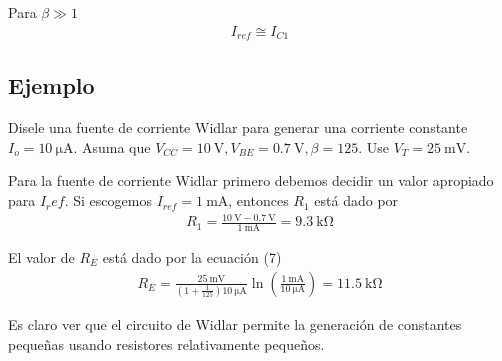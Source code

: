 \documentclass[12pt]{article}
\begin{document}
	\noindent Para $\beta \gg 1$
	\begin{align}
		I_{ref} \cong I_{C1}
	\end{align}
	
	\subsection*{Ejemplo}
	Disele una fuente de corriente Widlar para generar una corriente constante $I_o = \SI{10}{\micro\ampere}$. Asuma que $V_{CC} = \SI{10}{\volt}, V_{BE} = \SI{0.7}{\volt}, \beta=125$. Use $V_T = \SI{25}{\milli\volt}$.
	
	
	\noindent Para la fuente de corriente Widlar primero debemos decidir un valor apropiado para $I_ref$. Si escogemos $I_{ref} = \SI{1}{\milli\ampere}$, entonces $R_1$ está dado por
	\begin{align}
		R_1 = \frac{\SI{10}{\volt} - \SI{0.7}{\volt}}{\SI{1}{\milli\ampere}} = \SI{9.3}{\kilo\ohm}
	\end{align}
	
	\noindent El valor de $R_E$ está dado por la ecuación (7)
	\begin{align}
		R_E = \frac{\SI{25}{\milli\volt}}{\left(1 + \frac{1}{125}\right)\SI{10}{\micro\ampere}}\ln \left( \frac{\SI{1}{\milli\ampere}}{\SI{10}{\micro\ampere}} \right) = \SI{11.5}{\kilo\ohm}
	\end{align}
	
	\noindent Es claro ver que el circuito de Widlar permite la generación de constantes pequeñas usando resistores relativamente pequeños.
\end{document}
